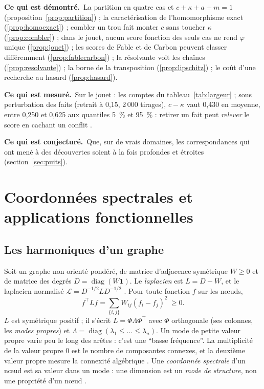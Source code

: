 \documentclass[11pt,a4paper]{article}
\theoremstyle{definition}
\theoremstyle{plain}
\newcommand{\demontre}{\par\noindent\textbf{Ce qui est démontré.}~}
\newcommand{\mesure}{\par\smallskip\noindent\textbf{Ce qui est mesuré.}~}
\newcommand{\conjecture}{\par\smallskip\noindent\textbf{Ce qui est conjecturé.}~}
\begin{document}
\begin{statuts}
\demontre La partition en quatre cas et $c+\kappa+a+m=1$ (proposition~\ref{prop:partition}) ;
la caractérisation de l'homomorphisme exact (\ref{prop:homoexact}) ; combler un trou fait monter $c$
sans toucher $\kappa$ (\ref{prop:combler}) ; dans le jouet, aucun score fonction des seuls cas ne
rend $\varphi$ unique (\ref{prop:jouet}) ; les scores de Fable et de Carbon peuvent classer
différemment (\ref{prop:fablecarbon}) ; la résolvante voit les chaînes (\ref{prop:resolvante}) ;
la borne de la transposition (\ref{prop:lipschitz}) ; le coût d'une recherche au hasard
(\ref{prop:hasard}).
\mesure Sur le jouet : les comptes du tableau~\ref{tab:largeur} ; sous perturbation des faits
(retrait à 0,15, 2\,000 tirages), $c-\kappa$ vaut 0,430 en moyenne, entre 0,250 et 0,625 aux quantiles
5~\% et 95~\% : retirer un fait peut \emph{relever} le score en cachant un conflit
\cite[section~5]{q9}.
\conjecture Que, sur de vrais domaines, les correspondances qui ont mené à des découvertes soient
à la fois profondes et étroites (section~\ref{sec:puits}).
\end{statuts}

\section{Coordonnées spectrales et applications fonctionnelles}
\label{sec:spectral}

\subsection{Les harmoniques d'un graphe}
Soit un graphe non orienté pondéré, de matrice d'adjacence symétrique $W\ge0$ et de matrice des
degrés $D=\operatorname{diag}(W\mathbf{1})$. Le \emph{laplacien} est $L=D-W$, et le laplacien
normalisé $\mathcal{L}=D^{-1/2}LD^{-1/2}$ \cite{chung1997}. Pour toute fonction $f$ sur les nœuds,
\[ f^\top Lf=\sum_{\{i,j\}}W_{ij}(f_i-f_j)^2\ \ge0. \]
$L$ est symétrique positif ; il s'écrit $L=\Phi\Lambda\Phi^\top$ avec $\Phi$ orthogonale (ses colonnes,
les \emph{modes propres}) et $\Lambda=\operatorname{diag}(\lambda_1\le\dots\le\lambda_n)$. Un mode de
petite valeur propre varie peu le long des arêtes : c'est une \enquote{basse fréquence}. La
multiplicité de la valeur propre 0 est le nombre de composantes connexes, et la deuxième valeur
propre mesure la connexité algébrique \cite{fiedler1973}. Une \emph{coordonnée spectrale} d'un nœud
est sa valeur dans un mode : une dimension est un \emph{mode de structure}, non une propriété d'un
nœud \cite[point (1)]{complementspectral}.
\end{document}
